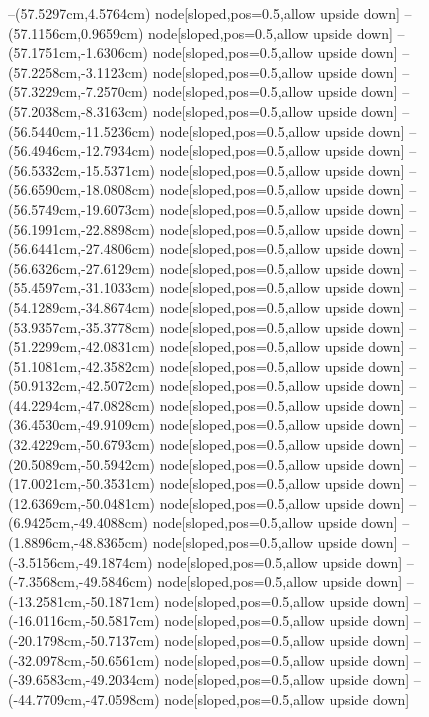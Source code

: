 --(57.5297cm,4.5764cm) node[sloped,pos=0.5,allow upside down]{\arrowIn}
--(57.1156cm,0.9659cm) node[sloped,pos=0.5,allow upside down]{\ArrowIn}
--(57.1751cm,-1.6306cm) node[sloped,pos=0.5,allow upside down]{\ArrowIn}
--(57.2258cm,-3.1123cm) node[sloped,pos=0.5,allow upside down]{\ArrowIn}
--(57.3229cm,-7.2570cm) node[sloped,pos=0.5,allow upside down]{\ArrowIn}
--(57.2038cm,-8.3163cm) node[sloped,pos=0.5,allow upside down]{\ArrowIn}
--(56.5440cm,-11.5236cm) node[sloped,pos=0.5,allow upside down]{\ArrowIn}
--(56.4946cm,-12.7934cm) node[sloped,pos=0.5,allow upside down]{\ArrowIn}
--(56.5332cm,-15.5371cm) node[sloped,pos=0.5,allow upside down]{\ArrowIn}
--(56.6590cm,-18.0808cm) node[sloped,pos=0.5,allow upside down]{\ArrowIn}
--(56.5749cm,-19.6073cm) node[sloped,pos=0.5,allow upside down]{\ArrowIn}
--(56.1991cm,-22.8898cm) node[sloped,pos=0.5,allow upside down]{\ArrowIn}
--(56.6441cm,-27.4806cm) node[sloped,pos=0.5,allow upside down]{\ArrowIn}
--(56.6326cm,-27.6129cm) node[sloped,pos=0.5,allow upside down]{\arrowIn}
--(55.4597cm,-31.1033cm) node[sloped,pos=0.5,allow upside down]{\ArrowIn}
--(54.1289cm,-34.8674cm) node[sloped,pos=0.5,allow upside down]{\ArrowIn}
--(53.9357cm,-35.3778cm) node[sloped,pos=0.5,allow upside down]{\arrowIn}
--(51.2299cm,-42.0831cm) node[sloped,pos=0.5,allow upside down]{\ArrowIn}
--(51.1081cm,-42.3582cm) node[sloped,pos=0.5,allow upside down]{\arrowIn}
--(50.9132cm,-42.5072cm) node[sloped,pos=0.5,allow upside down]{\arrowIn}
--(44.2294cm,-47.0828cm) node[sloped,pos=0.5,allow upside down]{\ArrowIn}
--(36.4530cm,-49.9109cm) node[sloped,pos=0.5,allow upside down]{\ArrowIn}
--(32.4229cm,-50.6793cm) node[sloped,pos=0.5,allow upside down]{\ArrowIn}
--(20.5089cm,-50.5942cm) node[sloped,pos=0.5,allow upside down]{\ArrowIn}
--(17.0021cm,-50.3531cm) node[sloped,pos=0.5,allow upside down]{\ArrowIn}
--(12.6369cm,-50.0481cm) node[sloped,pos=0.5,allow upside down]{\ArrowIn}
--(6.9425cm,-49.4088cm) node[sloped,pos=0.5,allow upside down]{\ArrowIn}
--(1.8896cm,-48.8365cm) node[sloped,pos=0.5,allow upside down]{\ArrowIn}
--(-3.5156cm,-49.1874cm) node[sloped,pos=0.5,allow upside down]{\ArrowIn}
--(-7.3568cm,-49.5846cm) node[sloped,pos=0.5,allow upside down]{\ArrowIn}
--(-13.2581cm,-50.1871cm) node[sloped,pos=0.5,allow upside down]{\ArrowIn}
--(-16.0116cm,-50.5817cm) node[sloped,pos=0.5,allow upside down]{\ArrowIn}
--(-20.1798cm,-50.7137cm) node[sloped,pos=0.5,allow upside down]{\ArrowIn}
--(-32.0978cm,-50.6561cm) node[sloped,pos=0.5,allow upside down]{\ArrowIn}
--(-39.6583cm,-49.2034cm) node[sloped,pos=0.5,allow upside down]{\ArrowIn}
--(-44.7709cm,-47.0598cm) node[sloped,pos=0.5,allow upside down]{\ArrowIn}
